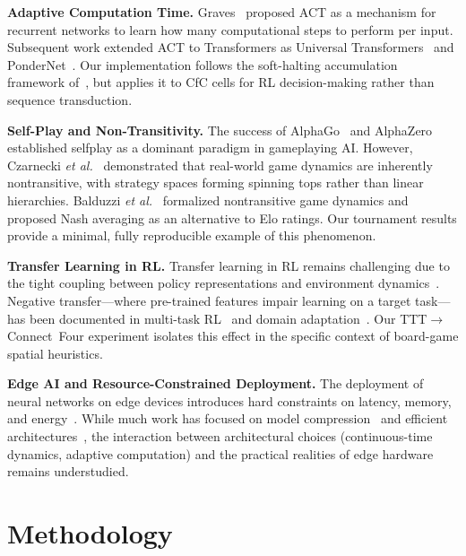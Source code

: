 \documentclass[conference]{IEEEtran}
\newcommand{\etal}{\textit{et al.}}
\begin{document}
\textbf{Adaptive Computation Time.}
Graves~\cite{graves2016adaptive} proposed ACT as a mechanism for recurrent networks to learn how many computational steps to perform per input. Subsequent work extended ACT to Transformers as Universal Transformers~\cite{dehghani2019universal} and PonderNet~\cite{banino2021pondernet}. Our implementation follows the soft-halting accumulation framework of~\cite{graves2016adaptive}, but applies it to CfC cells for RL decision-making rather than sequence transduction.

\textbf{Self-Play and Non-Transitivity.}
The success of AlphaGo~\cite{silver2016mastering} and AlphaZero~\cite{silver2018general} established self\-play as a dominant paradigm in game\-playing AI. However, Czarnecki \etal~\cite{czarnecki2020real} demonstrated that real-world game dynamics are inherently non\-transitive, with strategy spaces forming spinning tops rather than linear hierarchies. Balduzzi \etal~\cite{balduzzi2019open} formalized non\-transitive game dynamics and proposed Nash averaging as an alternative to Elo ratings. Our tournament results provide a minimal, fully reproducible example of this phenomenon.

\textbf{Transfer Learning in RL.}
Transfer learning in RL remains challenging due to the tight coupling between policy representations and environment dynamics~\cite{taylor2009transfer}. Negative transfer---where pre-trained features impair learning on a target task---has been documented in multi-task RL~\cite{parisotto2016actor} and domain adaptation~\cite{zhang2018study}. Our TTT$\to$Connect~Four experiment isolates this effect in the specific context of board-game spatial heuristics.

\textbf{Edge AI and Resource-Constrained Deployment.}
The deployment of neural networks on edge devices introduces hard constraints on latency, memory, and energy~\cite{chen2023deep, lin2020mcunet}. While much work has focused on model compression~\cite{han2016deep} and efficient architectures~\cite{howard2017mobilenets}, the interaction between architectural choices (continuous-time dynamics, adaptive computation) and the practical realities of edge hardware remains understudied.

\section{Methodology}
\label{sec:methodology}
\end{document}
